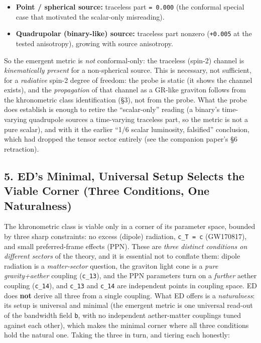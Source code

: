 \documentclass[
]{article}
\providecommand{\tightlist}{%
  \setlength{\itemsep}{0pt}\setlength{\parskip}{0pt}}
\begin{document}
\begin{itemize}
\tightlist
\item
  \textbf{Point / spherical source:} traceless part \texttt{=\ 0.000}
  (the conformal special case that motivated the scalar-only
  misreading).
\item
  \textbf{Quadrupolar (binary-like) source:} traceless part nonzero
  (\texttt{+0.005} at the tested anisotropy), growing with source
  anisotropy.
\end{itemize}

So the emergent metric is \emph{not} conformal-only: the traceless
(spin-2) channel is \emph{kinematically present} for a non-spherical
source. This is necessary, not sufficient, for a \emph{radiative} spin-2
degree of freedom: the probe is static (it shows the channel exists),
and the \emph{propagation} of that channel as a GR-like graviton follows
from the khronometric class identification (§3), not from the probe.
What the probe does establish is enough to retire the ``scalar-only''
reading (a binary's time-varying quadrupole sources a time-varying
traceless part, so the metric is not a pure scalar), and with it the
earlier ``1/6 scalar luminosity, falsified'' conclusion, which had
dropped the tensor sector entirely (see the companion paper's §6
retraction).

\subsection{5. ED's Minimal, Universal Setup Selects the Viable Corner
(Three Conditions, One
Naturalness)}\label{eds-minimal-universal-setup-selects-the-viable-corner-three-conditions-one-naturalness}

The khronometric class is viable only in a corner of its parameter
space, bounded by three sharp constraints: no excess (dipole) radiation,
\texttt{c\_T\ =\ c} (GW170817), and small preferred-frame effects (PPN).
These are \emph{three distinct conditions on different sectors} of the
theory, and it is essential not to conflate them: dipole radiation is a
\emph{matter-sector} question, the graviton light cone is a \emph{pure
gravity+aether} coupling (\texttt{c\_13}), and the PPN parameters turn
on a \emph{further} aether coupling (\texttt{c\_14}), and \texttt{c\_13}
and \texttt{c\_14} are independent points in coupling space. ED does
\textbf{not} derive all three from a single coupling. What ED offers is
a \emph{naturalness}: its setup is universal and minimal (the emergent
metric is one universal read-out of the bandwidth field \texttt{b}, with
no independent aether-matter couplings tuned against each other), which
makes the minimal corner where all three conditions hold the natural
one. Taking the three in turn, and tiering each honestly:
\end{document}
